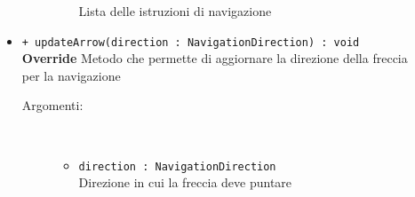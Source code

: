 \documentclass[../DefinizioneDiProdotto.tex]{subfiles}
\begin{document}
\begin{description}
\begin{itemize}
\begin{description}
\begin{itemize}
				Lista delle istruzioni di navigazione\end{itemize}
		\end{description}
		\item \texttt{+ updateArrow(direction : NavigationDirection) : void}\\
		\textbf{Override} Metodo che permette di aggiornare la direzione della freccia per la navigazione
		\begin{description}
			\item[Argomenti:] \
			\begin{itemize}
				\item \texttt{direction : NavigationDirection}\\
				Direzione in cui la freccia deve puntare\end{itemize}
		\end{description}
	\end{itemize}
\end{description}
\end{document}
